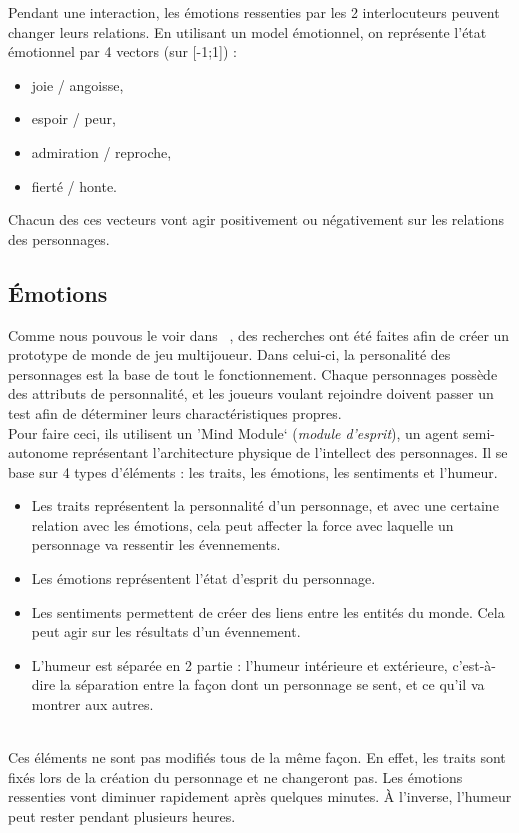 \documentclass[asi]{picINSA}
\begin{document}
Pendant une interaction, les émotions ressenties par les 2 interlocuteurs peuvent changer leurs relations. En utilisant un model émotionnel, on représente l'état émotionnel par 4 vectors (sur [-1;1]) :
\begin{itemize}
\item joie / angoisse,
\item espoir / peur,
\item admiration / reproche,
\item fierté / honte.
\end{itemize}
Chacun des ces vecteurs vont agir positivement ou négativement sur les relations des personnages.

\subsection{Émotions}

Comme nous pouvous le voir dans ~\cite{IRIS:conf/aiide/Eladhari2010}, des recherches ont été faites afin de créer un prototype de monde de jeu multijoueur. Dans celui-ci, la personalité des personnages est la base de tout le fonctionnement. Chaque personnages possède des attributs de personnalité, et les joueurs voulant rejoindre doivent passer un test afin de déterminer leurs charactéristiques propres.\\

Pour faire ceci, ils utilisent un \rq{}Mind Module\lq{} (\textit{module d'esprit}), un agent semi-autonome représentant l'architecture physique de l'intellect des personnages. Il se base sur 4 types d'éléments : les traits, les émotions, les sentiments et l'humeur.\\
\begin{itemize}
\item Les traits représentent la personnalité d'un personnage, et avec une certaine relation avec les émotions, cela peut affecter la force avec laquelle un personnage va ressentir les évennements.
\item Les émotions représentent l'état d'esprit du personnage.
\item Les sentiments permettent de créer des liens entre les entités du monde. Cela peut agir sur les résultats d'un évennement.
\item L'humeur est séparée en 2 partie : l'humeur intérieure et extérieure, c'est-à-dire la séparation entre la façon dont un personnage se sent, et ce qu'il va montrer aux autres.
\end{itemize}
~\\
Ces éléments ne sont pas modifiés tous de la même façon. En effet, les traits sont fixés lors de la création du personnage et ne changeront pas. Les émotions ressenties vont diminuer rapidement après quelques minutes. À l'inverse, l'humeur peut rester pendant plusieurs heures.
\end{document}
